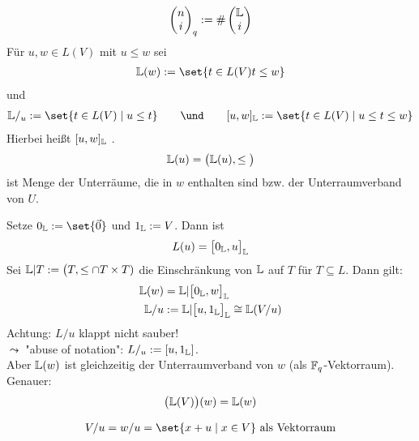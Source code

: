 \begin{notation}
	\begin{align*}
		\begin{pmatrix}
			n\\
			i
		\end{pmatrix}_q
		:=\#\begin{pmatrix}
			\mathbb{L}\\
			i
		\end{pmatrix}
	\end{align*}
	Für $u,w\in L(V)$ mit $u\leq w$ sei
	\begin{align*}
		\L(w):=\set{t\in L(V)\mit t\leq w}
	\end{align*}
	und
	\begin{align*}
		\L/_u:=\set{t\in L(V)\mid u\leq t}
		\qquad\und\qquad
		[u,w]_\L:=\set{t\in L(V)\mid u\leq t\leq w}
	\end{align*}
	Hierbei heißt $[u,w]_{\mathbb{L}}$ .
	\begin{align*}
		\mathbb{L}(u)=\big(\mathbb{L}(u),\leq\big)
	\end{align*}
	ist Menge der Unterräume, die in $w$ enthalten sind bzw. der Unterraumverband von $U$.
\end{notation}

	Setze $0_\L:=\set{\vec{0}}$ und $1_{\mathbb{L}}:=V$.
	Dann ist
	\begin{align*}
		L(u)=\big[0_{\mathbb{L}},u\big]_{\mathbb{L}}
	\end{align*}
	Sei $\mathbb{L}|T:=\big(T,\leq\cap T\times T)$ die Einschränkung von $\mathbb{L}$ auf $T$ für $T\subseteq L$.
	Dann gilt:
	\begin{align*}
		\mathbb{L}(w)&=\mathbb{L}|\big[0_{\mathbb{L}},w\big]_{\mathbb{L}}\\
		\mathbb{L}/u&:=\mathbb{L}|\big[u,1_{\mathbb{L}}\big]_{\mathbb{L}}\cong\mathbb{L}(V/u)
	\end{align*}
	Achtung: $L/u$ klappt nicht sauber!\\
	$\leadsto$ "abuse of notation": $L/_u:=[u,1_{\mathbb{L}}]$.\\
	Aber $\mathbb{L}(w)$ ist gleichzeitig der Unterraumverband von $w$ (als $\mathbb{F}_q$-Vektorraum).
Genauer:
\begin{align*}
	\big(\mathbb{L}(V)\big)(w)=\mathbb{L}(w)
\end{align*}

\begin{erinnerung}
	\begin{align*}
		V/u=w/u=\set{x+u\mid x\in V}\text{ als Vektorraum}
	\end{align*}
\end{erinnerung}


